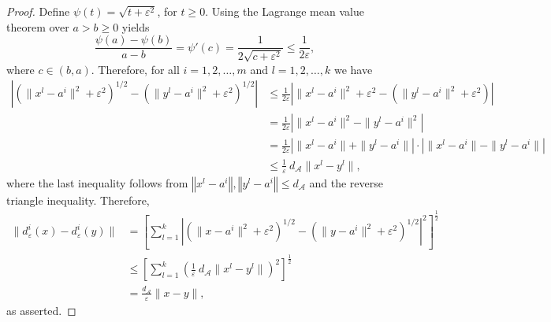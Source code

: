 \documentclass[11pt]{article}
\numberwithin{equation}{section}
\newcommand{\norm}[1]{\left\Vert {#1} \right\Vert} %
\def\abs#1{\left\lvert#1\right\rvert}
\begin{document}
\begin{proof}
Define $\psi(t)=\sqrt{t + {\varepsilon}^2}$, for $t \geq 0$. Using the Lagrange mean value theorem over $a > b \geq 0$ yields
\begin{equation*}
	\frac{\psi(a) - \psi(b)}{a - b} = \psi'(c) = \frac{1}{2\sqrt{c + {\varepsilon}^2}} \leq \frac{1}{2\varepsilon},
\end{equation*}
where $c \in (b,a)$.
Therefore, for all $i=1,2, \ldots, m$ and $l=1,2, \ldots, k$ we have
\begin{align*}
	\abs{\left( \|x^l-a^i\|^2  + {\varepsilon}^2 \right)^{1/2} - \left( \|y^l-a^i\|^2 + {\varepsilon}^2 \right)^{1/2} } 
	&\leq \frac{1}{2\varepsilon} \abs{ \|x^l-a^i\|^2 + {\varepsilon}^2 - \left( \|y^l-a^i\|^2 + {\varepsilon}^2 \right) } \\
	&= \frac{1}{2\varepsilon} \abs{\|x^l-a^i\|^2 - \|y^l-a^i\|^2} \\
	&= \frac{1}{2\varepsilon} \abs{\|x^l-a^i\| + \|y^l-a^i\|} \cdot \abs{\|x^l-a^i\| - \|y^l-a^i\|} \\
	&\leq \frac{1}{\varepsilon} \: d_{\mathcal{A}}\|x^l-y^l\| ,
\end{align*}
where the last inequality follows from $\norm{x^l-a^i},\norm{y^l-a^i} \leq d_{\mathcal{A}}$ and the reverse triangle inequality. Therefore,
\begin{align*}
	\|d_{\varepsilon}^i(x) - d_{\varepsilon}^i(y)\| 
	&= \left[ \sum_{l=1}^{k} \abs{\left( \|x-a^i\|^2  + {\varepsilon}^2 \right)^{1/2} - \left( \|y-a^i\|^2 + {\varepsilon}^2 \right)^{1/2} }^2 \right]^\frac{1}{2} \\
	&\leq \left[ \sum_{l=1}^{k} \left( \frac{1}{\varepsilon} \: d_{\mathcal{A}}\|x^l-y^l\| \right)^2 \right]^\frac{1}{2} \\
	&= \frac{ d_{\mathcal{A}}}{\varepsilon}\|x-y\| ,
\end{align*}
as asserted.
\end{proof}
\end{document}
